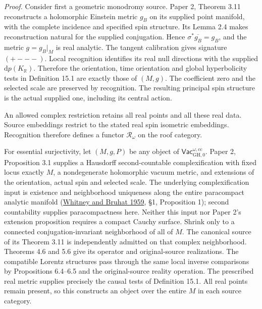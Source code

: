 \documentclass[
  english,
  11pt,
  reqno]{amsart}
\begin{document}
\emph{Proof.} Consider first a geometric monodromy source. Paper 2,
Theorem 3.11 reconstructs a holomorphic Einstein metric \(g_B\) on its
supplied point manifold, with the complete incidence and specified spin
structure. Its Lemma 2.4 makes reconstruction natural for the supplied
conjugation. Hence \(\sigma^*\overline{g_B}=g_B\), and the metric
\(g=g_B|_M\) is real analytic. The tangent calibration gives signature
\((+---)\). Local recognition identifies its real null directions with
the supplied \(\mathrm dp(K_{\mathbb R})\). Therefore the orientation,
time orientation and global hyperbolicity tests in Definition 15.1 are
exactly those of \((M,g)\). The coefficient zero and the selected scale
are preserved by recognition. The resulting principal spin structure is
the actual supplied one, including its central action.

An allowed complex restriction retains all real points and all these
real data. Source embeddings restrict to the stated real spin isometric
embeddings. Recognition therefore defines a functor
\(\mathcal R_\omega\) on the roof category.

For essential surjectivity, let \((M,g,P)\) be any object of
\(\mathsf{Vac}^{\omega,\mathrm{cc}}_{\mathrm{GH},0}\). Paper 2,
Proposition 3.1 supplies a Hausdorff second-countable complexification
with fixed locus exactly \(M\), a nondegenerate holomorphic vacuum
metric, and extensions of the orientation, actual spin and selected
scale. The underlying complexification input is existence and
neighborhood uniqueness along the entire paracompact analytic manifold
(\hyperref[ref-WhitneyBruhat1959]{Whitney and Bruhat 1959}, §1,
Proposition 1); second countability supplies paracompactness here.
Neither this input nor Paper 2's extension proposition requires a
compact Cauchy surface. Shrink only to a connected conjugation-invariant
neighborhood of all of \(M\). The canonical source of its Theorem 3.11
is independently admitted on that complex neighborhood. Theorems 4.6 and
5.6 give its operator and original-source realizations. The compatible
Lorentz structures pass through the same local inverse comparisons by
Propositions 6.4--6.5 and the original-source reality operation. The
prescribed real metric supplies precisely the causal tests of Definition
15.1. All real points remain present, so this constructs an object over
the entire \(M\) in each source category.
\end{document}
